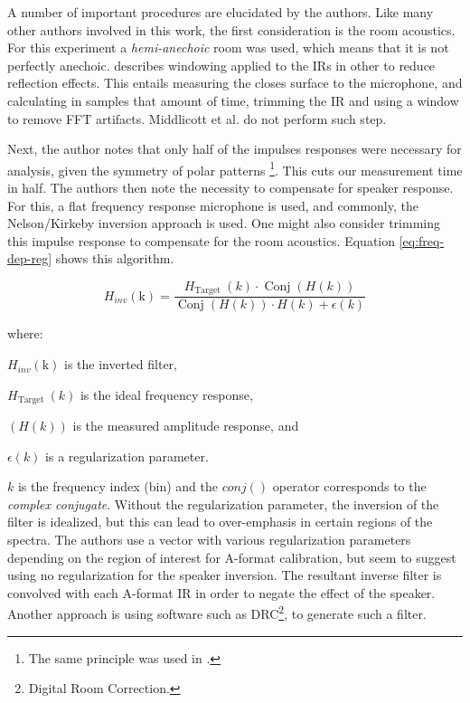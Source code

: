 A number of important procedures are elucidated by the authors. Like many other authors involved in this work, the first consideration is the room acoustics. For this experiment a \textit{hemi-anechoic} room was used, which means that it is not perfectly anechoic. \cite{lopez2019sphear} describes windowing applied to the IRs in other to reduce reflection effects. This entails measuring the closes surface to the microphone, and calculating in samples that amount of time, trimming the IR and using a window to remove FFT artifacts. Middlicott et al. do not perform such step.

Next, the author notes that only half of the impulses responses were necessary for analysis, given the symmetry of polar patterns \footnote{The same principle was used in \cite{zalles2019effects}.}. This cuts our measurement time in half. The authors then note the necessity to compensate for speaker response. For this, a flat frequency response microphone is used, and commonly, the Nelson/Kirkeby inversion approach is used. One might also consider trimming this impulse response to compensate for the room acoustics. Equation \ref{eq:freq-dep-reg} shows this algorithm. 

\begin{equation}
H_{i n v}(\mathrm{k})=\frac{H_{\text {Target }}(k) \cdot \operatorname{Conj}(H(k))}{\operatorname{Conj}(H(k)) \cdot H(k)+\epsilon(k)}
\label{eq:freq-dep-reg}
\end{equation}

\noindent where:
\begin{description}
\item  $H_{i n v}(\mathrm{k})$ is the inverted filter,
\item  $H_{\text {Target }}(k)$ is the ideal frequency response,
\item  $(H(k))$ is the measured amplitude response, and
\item $\epsilon(k)$ is a regularization parameter.
\end{description}

$k$ is the frequency index (bin) and the $conj()$ operator corresponds to the \textit{complex conjugate}. Without the regularization parameter, the inversion of the filter is idealized, but this can lead to over-emphasis in certain regions of the spectra. The authors use a vector with various regularization parameters depending on the region of interest for A-format calibration, but seem to suggest using no regularization for the speaker inversion. The resultant inverse filter is convolved with each A-format IR in order to negate the effect of the speaker. Another approach is using software such as DRC\footnote{Digital Room Correction.}, to generate such a filter.

